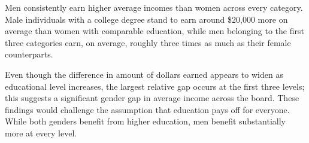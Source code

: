 Men consistently earn higher average incomes than women across every category. Male individuals with a college degree stand to earn around \$20,000 more on average than women with comparable education, while men belonging to the first three categories earn, on average, roughly three times as much as their female counterparts. 

Even though the difference in amount of dollars earned appears to widen as educational level increases, the largest relative gap occurs at the first three levels; this suggests a significant gender gap in average income across the board. These findings would challenge the assumption that education pays off for everyone. While both genders benefit from higher education, men benefit substantially more at every level.

